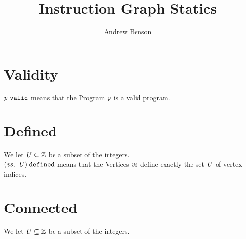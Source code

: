 \documentclass[12pt]{article}
\title{Instruction Graph Statics}
\author{Andrew Benson}
\date{}
\begin{document}
\maketitle

\thispagestyle{simple}

\section{Validity}

$\valid{\nterm{p}}$ means that the Program $\nterm{p}$ is a valid program.

\begin{mathpar}
   
\end{mathpar}

\section{Defined}

We let $\nterm{U} \subseteq \mathbb{Z}$ be a subset of the integers.\\

$\defined{\nterm{vs}}{\nterm{U}}$ means that the Vertices $\nterm{vs}$ define
exactly the set $\nterm{U}$ of vertex indices.

\begin{mathpar}
   

   
\end{mathpar}

\section{Connected}

We let $\nterm{U} \subseteq \mathbb{Z}$ be a subset of the integers.\\
\end{document}
